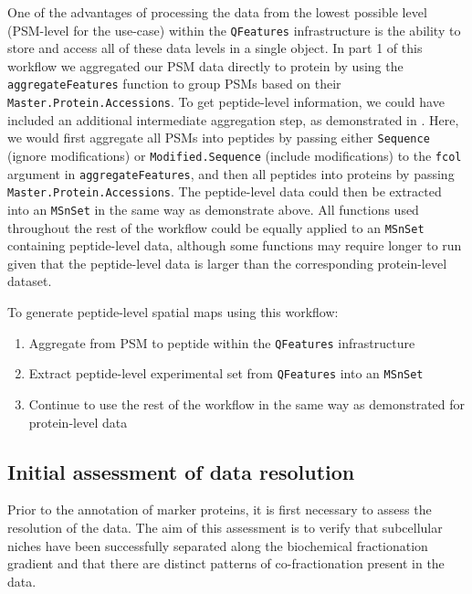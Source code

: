 \documentclass[9pt,a4paper,]{extarticle}
\begin{document}
One of the advantages of processing the data from the lowest possible level
(PSM-level for the use-case) within the \texttt{QFeatures} infrastructure is the ability
to store and access all of these data levels in a single object. In part 1 of this
workflow we aggregated our PSM data directly to protein by using the
\texttt{aggregateFeatures} function to group PSMs based on their \texttt{Master.Protein.Accessions}.
To get peptide-level information, we could have included an additional intermediate
aggregation step, as demonstrated in \citet{Hutchings2023}. Here, we would first aggregate
all PSMs into peptides by passing either \texttt{Sequence} (ignore modifications) or
\texttt{Modified.Sequence} (include modifications) to the \texttt{fcol} argument in
\texttt{aggregateFeatures}, and then all peptides into proteins by passing
\texttt{Master.Protein.Accessions}. The peptide-level data could then be extracted into
an \texttt{MSnSet} in the same way as demonstrate above. All functions used throughout
the rest of the workflow could be equally applied to an \texttt{MSnSet} containing
peptide-level data, although some functions may require longer to run given that
the peptide-level data is larger than the corresponding protein-level dataset.

To generate peptide-level spatial maps using this workflow:

\begin{enumerate}
\def\labelenumi{\arabic{enumi}.}
\item
  Aggregate from PSM to peptide within the \texttt{QFeatures} infrastructure
\item
  Extract peptide-level experimental set from \texttt{QFeatures} into an \texttt{MSnSet}
\item
  Continue to use the rest of the workflow in the same way as demonstrated for protein-level data
\end{enumerate}

\subsection{Initial assessment of data resolution}\label{initial-assessment-of-data-resolution}

Prior to the annotation of marker proteins, it is first necessary to assess the
resolution of the data. The aim of this assessment is to verify that subcellular
niches have been successfully separated along the biochemical fractionation
gradient and that there are distinct patterns of co-fractionation present in the
data.
\end{document}
